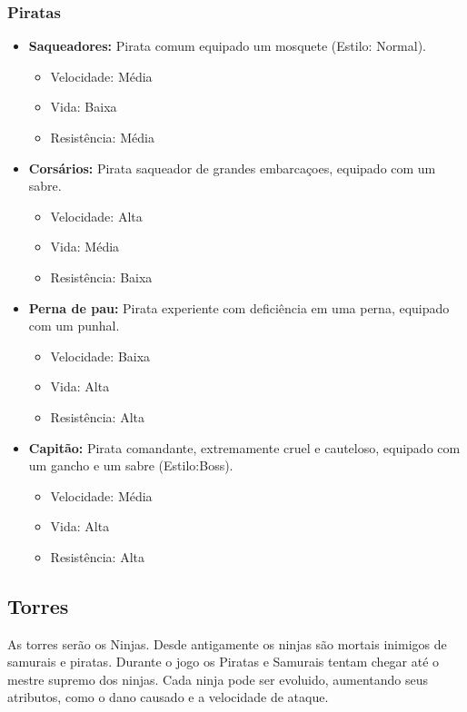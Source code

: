 \documentclass[12pt,a4paper]{article}
\begin{document}
\subsubsection{Piratas}
\begin{itemize}
\item \textbf{Saqueadores:} Pirata comum equipado um mosquete (Estilo: Normal).
	\begin{itemize}
	\item Velocidade: Média
	\item Vida: Baixa
	\item Resistência: Média
	\end{itemize}
\item \textbf{Corsários:} Pirata saqueador de grandes embarcaçoes, equipado com um sabre.
	\begin{itemize}
	\item Velocidade: Alta
	\item Vida: Média
	\item Resistência: Baixa
	\end{itemize}
\item \textbf{Perna de pau:} Pirata experiente com deficiência em uma perna, equipado com um punhal.
	\begin{itemize}
	\item Velocidade: Baixa
	\item Vida: Alta
	\item Resistência: Alta
	\end{itemize}
\item \textbf{Capitão:} Pirata comandante, extremamente cruel e cauteloso, equipado com um gancho e um sabre (Estilo:Boss).
	\begin{itemize}
	\item Velocidade: Média
	\item Vida: Alta
	\item Resistência: Alta
	\end{itemize}
\end{itemize}

\subsection{Torres}
	As torres serão os Ninjas. Desde antigamente os ninjas são mortais inimigos de samurais e
piratas. Durante o jogo os Piratas e Samurais tentam chegar até o mestre supremo dos ninjas. Cada
ninja pode ser evoluido, aumentando seus atributos, como o dano causado e a velocidade de ataque.\\
\end{document}
